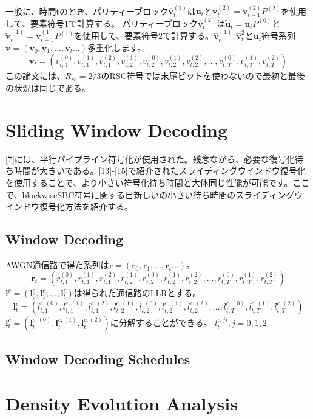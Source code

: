 \documentclass[20 pts]{article}
\begin{document}
\paragraph{}
一般に、時間tのとき、パリティーブロック$\hat{\mathbf{v}}^{(1)}_t$は$\mathbf{u}_t$と$\widetilde{\mathbf{v}}^{(2)}_t=\mathbf{v}^{(2)}_{t-1}P^{(2)}$を使用して、要素符号1で計算する。
パリティーブロック$\hat{\mathbf{v}}^{(2)}_t$は$\widetilde{\mathbf{u}}_t=\mathbf{u}_tP^{(0)}$と$\widetilde{\mathbf{v}}^{(1)}_t=\mathbf{v}^{(1)}_{t-1}P^{(1)}$を使用して、要素符号2で計算する。$\hat{\mathbf{v}}^{(1)}_t,\hat{\mathbf{v}}^{2}_t$と$\mathbf{u}_t$符号系列$\mathbf{v}=(\mathbf{v}_0,\mathbf{v}_1,...,\mathbf{v}_t...) $多重化します。
\begin{equation}
\mathbf{v}_t=(v^{(0)}_{t,1},v^{(1)}_{t,1},v^{(2)}_{t,1},v^{(1)}_{t,2},v^{(0)}_{t,2},v^{(1)}_{t,2},v^{(2)}_{t,2},...,v^{(0)}_{t,T},v^{(1)}_{t,T},v^{(2)}_{t,T})
\end{equation}
この論文には、$R_{cc}=2/3$のRSC符号では末尾ビットを使わないので最初と最後の状況は同じである。
 \section{Sliding Window Decoding}
 [7]には、平行パイプライン符号化が使用された。残念ながら、必要な復号化待ち時間が大きいである。[13]-[15]で紹介されたスライディングウインドウ復号化を使用することで、より小さい符号化待ち時間と大体同じ性能が可能です。ここで、blockwiseSBC符号に関する目新しいの小さい待ち時間のスライディングウインドウ復号化方法を紹介する。
 \subsection{Window Decoding}
 AWGN通信路で得た系列は$\mathbf{r}=(\mathbf{r}_0,\mathbf{r}_1,...,\mathbf{r}_t...) $。
\begin{equation*}
\mathbf{r}_t=(r^{(0)}_{t,1},r^{(1)}_{t,1},r^{(2)}_{t,1},r^{(1)}_{t,2},r^{(0)}_{t,2},r^{(1)}_{t,2},r^{(2)}_{t,2},...,r^{(0)}_{t,T},r^{(1)}_{t,T},r^{(2)}_{t,T})
\end{equation*}
$\mathbf{l}^c=(\mathbf{l}^c_0,\mathbf{l}^c_1,...,\mathbf{l}^c_t)$は得られた通信路のLLRとする。
\begin{equation*}
\mathbf{l}^c_t=(l^{c,(0)}_{t,1},l^{c,(1)}_{t,1},l^{c,(2)}_{t,1},l^{c,(1)}_{t,2},l^{,(0)}_{t,2},l^{c,(1)}_{t,2},l^{c,(2)}_{t,2},...,l^{c,(0)}_{t,T},l^{c,(1)}_{t,T},l^{c,(2)}_{t,T})
\end{equation*}
$\mathbf{l}^c_t=(\mathbf{l}^{c,(0)}_{t},\mathbf{l}^{c,(1)}_{t},\mathbf{l}^{c,(2)}_{t})$に分解することができる。
$l^{c,j)}_{t},j = 0,1,2$
 \subsection{Window Decoding Schedules}
 
 \section{Density Evolution Analysis}
 
 
 
\end{document}
